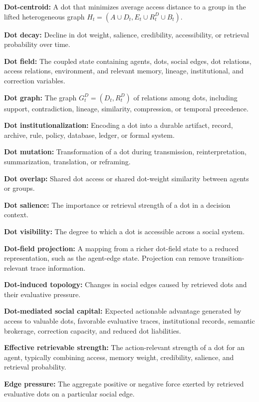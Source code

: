 \documentclass[11pt]{article}
\theoremstyle{remark}
\begin{document}
\textbf{Dot-centroid:} A dot that minimizes average access distance to a group in the lifted heterogeneous graph $H_t=(A\cup D_t,E_t\cup R_t^D\cup B_t)$.

\textbf{Dot decay:} Decline in dot weight, salience, credibility, accessibility, or retrieval probability over time.

\textbf{Dot field:} The coupled state containing agents, dots, social edges, dot relations, access relations, environment, and relevant memory, lineage, institutional, and correction variables.

\textbf{Dot graph:} The graph $G_t^D=(D_t,R_t^D)$ of relations among dots, including support, contradiction, lineage, similarity, compression, or temporal precedence.

\textbf{Dot institutionalization:} Encoding a dot into a durable artifact, record, archive, rule, policy, database, ledger, or formal system.

\textbf{Dot mutation:} Transformation of a dot during transmission, reinterpretation, summarization, translation, or reframing.

\textbf{Dot overlap:} Shared dot access or shared dot-weight similarity between agents or groups.

\textbf{Dot salience:} The importance or retrieval strength of a dot in a decision context.

\textbf{Dot visibility:} The degree to which a dot is accessible across a social system.

\textbf{Dot-field projection:} A mapping from a richer dot-field state to a reduced representation, such as the agent-edge state. Projection can remove transition-relevant trace information.

\textbf{Dot-induced topology:} Changes in social edges caused by retrieved dots and their evaluative pressure.

\textbf{Dot-mediated social capital:} Expected actionable advantage generated by access to valuable dots, favorable evaluative traces, institutional records, semantic brokerage, correction capacity, and reduced dot liabilities.

\textbf{Effective retrievable strength:} The action-relevant strength of a dot for an agent, typically combining access, memory weight, credibility, salience, and retrieval probability.

\textbf{Edge pressure:} The aggregate positive or negative force exerted by retrieved evaluative dots on a particular social edge.
\end{document}
